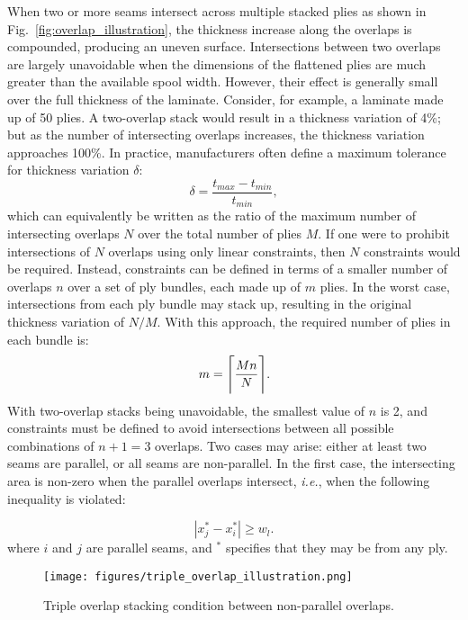 When two or more seams intersect across multiple stacked plies as shown in Fig.~\ref{fig:overlap_illustration},
the thickness increase along the overlaps is compounded, producing an uneven surface. Intersections between two overlaps are largely unavoidable when the dimensions of the flattened plies are much greater than the available spool width. However, their effect is generally small over the full thickness of the laminate. Consider, for example, a laminate made up of 50 plies. A two-overlap stack would result in a thickness variation of 4\%; but as the number of intersecting overlaps increases, the thickness variation approaches 100\%. In practice, manufacturers often define a maximum tolerance for thickness variation $\delta$:
\begin{equation}
    \delta = \frac{t_{max} - t_{min}}{t_{min}},
\end{equation}
which can equivalently be written as the ratio of the maximum number of intersecting overlaps $N$ over the total number of plies $M$.
If one were to prohibit intersections of $N$ overlaps using only linear constraints, then $N$ constraints would be required.
Instead, constraints can be defined in terms of a smaller number of overlaps $n$ over a set of ply bundles, each made up of $m$ plies. In the worst case, intersections from each ply bundle may stack up, resulting in the original thickness variation of $N/M$. With this approach, the required number of plies in each bundle is:
\begin{equation}
    m = \Bigg{\lceil} \frac{Mn}{N} \Bigg{\rceil}.
\end{equation}
With two-overlap stacks being unavoidable, the smallest value of $n$ is 2, and constraints must be defined to avoid intersections between all possible combinations of $n + 1 = 3$ overlaps. Two cases may arise: either at least two seams are parallel, or all seams are non-parallel. In the first case, the intersecting area is non-zero when the parallel overlaps intersect, \emph{i.e.}, when the following inequality is violated:

\begin{equation}
\label{eq:lap_stacking_parallel}
    |x_j^* - x_i^*| \geq w_l.
\end{equation}
where $i$ and $j$ are parallel seams, and $^*$ specifies that they may be from any ply.

\begin{figure}
    \centering
    \texttt{[image: figures/triple\_overlap\_illustration.png]}
    \caption{Triple overlap stacking condition between non-parallel overlaps.}
    \label{fig:triple_overlap_illustration}
\end{figure}

